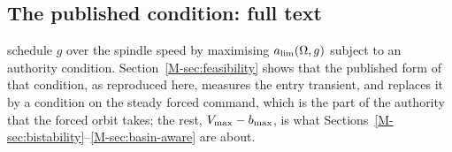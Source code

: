 
\subsection{The published condition: full text}\label{supp:std-feas-pub}

\citet{ozsoy2026robust} schedule $g$ over the spindle speed by maximising $a_{\lim}(\Omega,g)$ subject to an authority condition. Section~\ref{M-sec:feasibility} shows that the published form of that condition, as reproduced here, measures the entry transient, and replaces it by a condition on the steady forced command, which is the part of the authority that the forced orbit takes; the rest, $V_{\max}-b_{\max}$, is what Sections~\ref{M-sec:bistability}--\ref{M-sec:basin-aware} are about.

